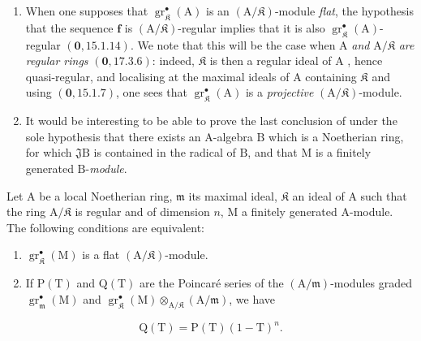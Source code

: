 \begin{remarks}[19.7.2]
\label{IV.19.7.2}
\medskip\noindent
\begin{enumerate}
\item[\rm(i)] When one supposes that $\operatorname{gr}_\mathfrak K^\bullet(\mathrm{A})$ is an $(\mathrm{A}/\mathfrak K)$-module \emph{flat}, the hypothesis that the sequence $\mathbf{f}$ is $(\mathrm{A}/\mathfrak K)$-regular implies that it is also $\operatorname{gr}_\mathfrak K^\bullet(\mathrm{A})$-regular $(\mathbf{0},15.1.14)$. We note that this will be the case when $\mathrm{A}$ \emph{and} $\mathrm{A}/\mathfrak K$ \emph{are regular rings} $(\mathbf{0},17.3.6)$: indeed, $\mathfrak K$ is then a regular ideal of $\mathrm{A}$ , hence quasi-regular, and localising at the maximal ideals of $\mathrm{A}$ containing $\mathfrak K$ and using $(\mathbf{0},15.1.7)$, one sees that $\operatorname{gr}_\mathfrak K^\bullet(\mathrm{A})$ is a \emph{projective} $(\mathrm{A}/\mathfrak K)$-module.
\item[\rm(ii)] It would be interesting to be able to prove the last conclusion of  under the sole hypothesis that there exists an $\mathrm{A}$-algebra $\mathrm{B}$ which is a Noetherian ring, for which $\mathfrak{J}\mathrm{B}$ is contained in the radical of $\mathrm{B}$, and that $\mathrm{M}$ is a finitely generated $\mathrm{B}$-\emph{module}.
\end{enumerate}
\end{remarks}

\begin{corollary}[19.7.3]
\label{IV.19.7.3}
Let $\mathrm{A}$ be a local Noetherian ring, $\mathfrak{m}$ its maximal ideal, $\mathfrak K$ an ideal of $\mathrm{A}$ such that the ring $\mathrm{A}/\mathfrak K$ is regular and of dimension $n$, $\mathrm{M}$ a finitely generated $\mathrm{A}$-module. The following conditions are equivalent:
\begin{enumerate}
\item[\rm a)] $\operatorname{gr}_\mathfrak K^\bullet(\mathrm{M})$ is a flat $(\mathrm{A}/\mathfrak K)$-module.
\item[\rm b)] If $\mathrm{P}(\mathrm{T})$ and $\mathrm{Q}(\mathrm{T})$ are the Poincar\'e series of the $(\mathrm{A}/\mathfrak{m})$-modules graded $\operatorname{gr}_\mathfrak{m}^\bullet(\mathrm{M})$ and $\operatorname{gr}_\mathfrak K^\bullet(\mathrm{M})\otimes_{\mathrm{A}/\mathfrak K}(\mathrm{A}/\mathfrak{m})$, we have
\end{enumerate}
\begin{equation}
  \mathrm{Q}(\mathrm{T})=\mathrm{P}(\mathrm{T})(1-\mathrm{T})^n.
  \tag{19.7.3.1}
\label{IV.19.7.3.1}
\end{equation}
\end{corollary}

